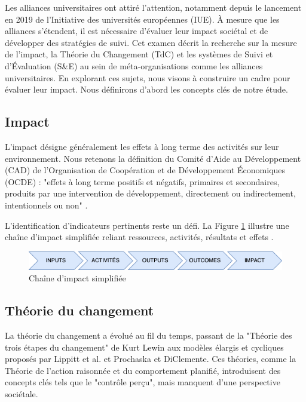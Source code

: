 Les alliances universitaires ont attiré l'attention, notamment depuis le lancement en 2019 de l'Initiative des universités européennes (IUE). À mesure que les alliances s'étendent, il est nécessaire d'évaluer leur impact sociétal et de développer des stratégies de suivi. Cet examen décrit la recherche sur la mesure de l'impact, la Théorie du Changement (TdC) et les systèmes de Suivi et d'Évaluation (S\&E) au sein de méta-organisations comme les alliances universitaires. En explorant ces sujets, nous visons à construire un cadre pour évaluer leur impact. Nous définirons d'abord les concepts clés de notre étude.

\subsection{Impact}
L'impact désigne généralement les effets à long terme des activités sur leur environnement. Nous retenons la définition du Comité d'Aide au Développement (CAD) de l'Organisation de Coopération et de Développement Économiques (OCDE) : "effets à long terme positifs et négatifs, primaires et secondaires, produits par une intervention de développement, directement ou indirectement, intentionnels ou non" \cite{oecd_quality_2010}.

L'identification d'indicateurs pertinents reste un défi. La Figure \ref{fig:simplified-impact-chain} illustre une chaîne d'impact simplifiée reliant ressources, activités, résultats et effets \cite{peersman_when_2016}.

\begin{figure}
    \centering 
    \includegraphics[width=1\linewidth]{images/Diagrams-IMPACT.png} 
    \caption{Chaîne d'impact simplifiée\cite{peersman_when_2016}}
    \label{fig:simplified-impact-chain} 
\end{figure}

\subsection{Théorie du changement}
La théorie du changement a évolué au fil du temps, passant de la "Théorie des trois étapes du changement" de Kurt Lewin\cite{lewin_frontiers_1947} aux modèles élargis et cycliques proposés par Lippitt et al.\cite{lippitt_dynamics_1958} et Prochaska et DiClemente\cite{prochaska_stages_1983}. Ces théories, comme la Théorie de l’action raisonnée et du comportement planifié, introduisent des concepts clés tels que le "contrôle perçu", mais manquent d’une perspective sociétale. 

